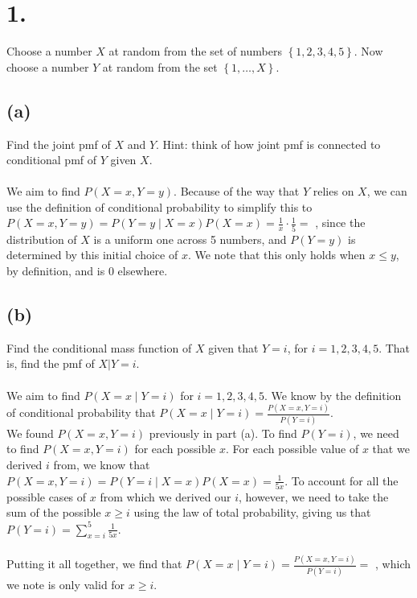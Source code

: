 \documentclass{article}
\begin{document}
\thispagestyle{firstpageheader}

\section*{1.}
{\Large 
Choose a number $X$ at random from the set of numbers
$\left\{ 1,2,3,4,5\right\} $. Now choose a number $Y$ at random from the set $\left\{ 1,\dots,X\right\} $. 

\subsection*{(a)}
Find the joint pmf of $X$ and $Y$. Hint: think of how  joint pmf  is connected to conditional pmf of $Y$ given $X$. \\ \\
We aim to find $P(X = x, Y = y)$. Because of the way that $Y$ relies on $X$, we can use the definition of conditional probability to simplify this to $P(X = x, Y = y) = P(Y = y \mid X = x)P(X = x) = \frac{1}{x} \cdot \frac{1}{5} = $ , since the distribution of $X$ is a uniform one across 5 numbers, and $P(Y = y)$ is determined by this initial choice of $x$. We note that this only holds when $x \leq y$, by definition, and is 0 elsewhere.

\subsection*{(b)}
Find the conditional mass function of $X$ given that $Y=i$,
for $i=1,2,3,4,5$. That is, find the pmf of $X|{Y=i}$. \\ \\ 
We aim to find $P(X = x \mid Y = i)$ for $i = 1,2,3,4,5$. We know by the definition of conditional probability that $P(X = x \mid Y = i) = \frac{P(X = x, Y = i)}{P(Y = i)}$. \\
We found $P(X = x, Y = i)$ previously in part (a). To find $P(Y = i)$, we need to find $P(X = x, Y = i)$ for each possible $x$. For each possible value of $x$ that we derived $i$ from, we know that $P(X = x, Y = i) = P(Y = i \mid X = x)P(X = x) = \frac{1}{5x}$. To account for all the possible cases of $x$ from which we derived our $i$, however, we need to take the sum of the possible $x \geq i$ using the law of total probability, giving us that $P(Y = i) = \sum_{x = i}^{5} \frac{1}{5x}$. \\ \\ 
Putting it all together, we find that $P(X = x \mid Y = i) = \frac{P(X = x, Y = i)}{P(Y = i)} = $ , which we note is only valid for $x \geq i$.

}
\end{document}
